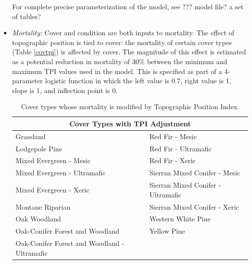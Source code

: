 \begin{itemize}
For complete precise parameterization of the model, see ??? model file? a set of tables?


\item \emph{Mortality:} Cover and condition are both inputs to mortality. The effect of topographic position is tied to cover: the mortality of certain cover types (Table \ref{covtpi}) is affected by cover. The magnitude of this effect is estimated as a potential reduction in mortality of 30\% between the minimum and maximum TPI values used in the model. This is specified as part of a 4-parameter logistic function in which the left value is 0.7, right value is 1, slope is 1, and inflection point is 0. 

\begin{table}[htbp]
\small
\centering
\caption{Cover types whose mortality is modified by Topographic Position Index.}
\begin{tabular}{ll}
\hline
\multicolumn{2}{c}{\textbf{Cover Types with TPI Adjustment}} \\
\hline
Grassland     									& Red Fir - Mesic   					\\
Lodgepole Pine    								& Red Fir - Ultramafic					\\
Mixed Evergreen - Mesic							& Red Fir - Xeric    					\\
Mixed Evergreen - Ultramafic     				& Sierran Mixed Conifer - Mesic    		\\
Mixed Evergreen - Xeric 						& Sierran Mixed Conifer - Ultramafic 	\\
Montane Riparian								& Sierran Mixed Conifer - Xeric 		\\
Oak Woodland 									& Western White Pine					\\
Oak-Conifer Forest and Woodland 				& Yellow Pine 							\\
Oak-Conifer Forest and Woodland - Ultramafic 	&										\\
\hline
\end{tabular}
\end{table}


\end{itemize}
